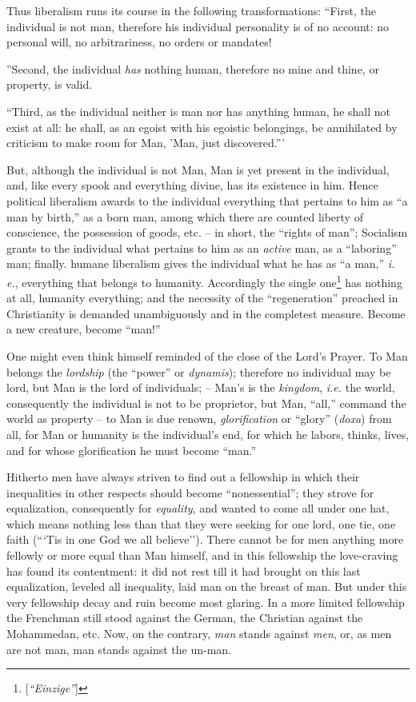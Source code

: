 \documentclass[12pt,a4paper]{book}
\begin{document}
Thus liberalism runs its course in the following transformations: ``First, 
the individual is not man, therefore his individual personality is of no 
account: no personal will, no arbitrariness, no orders or mandates!

''Second, the individual \textit{has} nothing human, therefore no mine and 
thine, or property, is valid.

``Third, as the individual neither is man nor has anything human, he shall 
not exist at all: he shall, as an egoist with his egoistic belongings, be 
annihilated by criticism to make room for Man, 'Man, just discovered.'''

But, although the individual is not Man, Man is yet present in the individual, 
and, like every spook and everything divine, has its existence in him. Hence 
political liberalism awards to the individual everything that pertains to him 
as ``a man by birth,'' as a born man, among which there are counted liberty 
of conscience, the possession of goods, etc. -- in short, the ``rights of 
man''; Socialism grants to the individual what pertains to him as an 
\textit{active} man, as a ``laboring'' man; finally. humane liberalism gives 
the individual what he has as ``a man,'' \textit{i. e.}, everything that 
belongs to humanity. Accordingly the single 
one\footnote{[\textit{``Einzige''}]} has nothing at all, humanity 
everything; and the necessity of the ``regeneration'' preached in 
Christianity is demanded unambiguously and in the completest measure. Become a 
new creature, become ``man!''

One might even think himself reminded of the close of the Lord's Prayer. To 
Man belongs the \textit{lordship} (the ``power'' or \textit{dynamis}); 
therefore no individual may be lord, but Man is the lord of individuals; -- 
Man's is the \textit{kingdom}, \textit{i.e.} the world, consequently the 
individual is not to be proprietor, but Man, ``all,'' command the world as 
property -- to Man is due renown, \textit{glorification} or ``glory'' 
(\textit{doxa}) from all, for Man or humanity is the individual's end, for 
which he labors, thinks, lives, and for whose glorification he must become 
``man.''

Hitherto men have always striven to find out a fellowship in which their 
inequalities in other respects should become ``nonessential''; they strove 
for equalization, consequently for \textit{equality}, and wanted to come all 
under one hat, which means nothing less than that they were seeking for one 
lord, one tie, one faith (```Tis in one God we all believe''). There cannot 
be for men anything more fellowly or more equal than Man himself, and in this 
fellowship the love-craving has found its contentment: it did not rest till it 
had brought on this last equalization, leveled all inequality, laid man on the 
breast of man. But under this very fellowship decay and ruin become most 
glaring. In a more limited fellowship the Frenchman still stood against the 
German, the Christian against the Mohammedan, etc. Now, on the contrary, 
\textit{man} stands against \textit{men}, or, as men are not man, man stands 
against the un-man.
\end{document}
